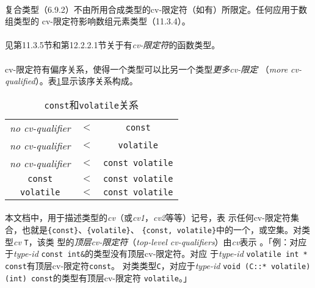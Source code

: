 \paragraph{}
复合类型（6.9.2）不由所用合成类型的cv-限定符（如有）所限定。任何应用于数组类型的
cv-限定符影响数组元素类型（11.3.4）。

\paragraph{}
见第11.3.5节和第12.2.2.1节关于有\textit{cv-限定符}的函数类型。

\paragraph{}
cv-限定符有偏序关系，使得一个类型可以比另一个类型\textit{更多cv-限定}
（\textit{more cv-qualified}）。表\ref{tab:cvrel}显示该序关系构成。
\begin{table}
  \centering
  \caption{\texttt{const}和\texttt{volatile}关系}
  \begin{tabular}{|ccc|}
    \hline
    \textit{no cv-qualifier} & $ < $ & \texttt{const}          \\
    \textit{no cv-qualifier} & $ < $ & \texttt{volatile}       \\
    \textit{no cv-qualifier} & $ < $ & \texttt{const volatile} \\
    \texttt{const}           & $ < $ & \texttt{const volatile} \\
    \texttt{volatile}        & $ < $ & \texttt{const volatile} \\
    \hline
  \end{tabular}
  \label{tab:cvrel}
\end{table}

\paragraph{}
本文档中，用于描述类型的\textit{cv}（或\textit{cv1}，\textit{cv2}等等）记号，表
示任何cv-限定符集合，也就是\texttt{\{const\}}、\texttt{\{volatile\}}、
\texttt{\{const, volatile\}}中的一个，或空集。对类型\textit{cv} \texttt{T}，该类
型的\textit{顶层cv-限定符}（\textit{top-level cv-qualifiers}）由\textit{cv}表示
。「例：对应于\textit{type-id} \texttt{const int\&}的类型没有顶层cv-限定符。对应
于\textit{type-id} \texttt{volatile int * const}有顶层cv-限定符\texttt{const}。
对类类型\texttt{C}，对应于\textit{type-id}
\texttt{void (C::* volatile)(int) const}的类型有顶层cv-限定符
\texttt{volatile}。」

